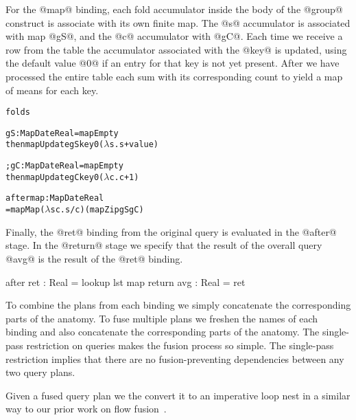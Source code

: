 For the @map@ binding, each fold accumulator inside the body of the @group@ construct is associate with its own finite map. The @s@ accumulator is associated with map @gS@, and the @c@ accumulator with @gC@. Each time we receive a row from the table the accumulator associated with the @key@ is updated, using the default value @0@ if an entry for that key is not yet present. After we have processed the entire table each sum with its corresponding count to yield a map of means for each key.
\begin{alltt}
  folds  { gS  : Map Date Real = mapEmpty
           then mapUpdate gS key 0 (\(\lambda\)s. s + value)

         ; gC  : Map Date Real = mapEmpty
           then mapUpdate gC key 0 (\(\lambda\)c. c + 1) }

  after  { map : Map Date Real
            = mapMap (\(\lambda\)s c. s / c) (mapZip gS gC) }
\end{alltt}


Finally, the @ret@ binding from the original query is evaluated in the @after@ stage. In the @return@ stage we specify that the result of the overall query @avg@ is the result of the @ret@ binding.
\begin{code}
  after  { ret : Real = lookup lst map }
  return { avg : Real = ret }
\end{code}

To combine the plans from each binding we simply concatenate the corresponding parts of the anatomy. To fuse multiple plans we freshen the names of each binding and also concatenate the corresponding parts of the anatomy. The single-pass restriction on queries makes the fusion process so simple. The single-pass restriction implies that there are no fusion-preventing dependencies between any two query plans. 

Given a fused query plan we the convert it to an imperative loop nest in a similar way to our prior work on flow fusion~\cite{lippmeier2013data}.

